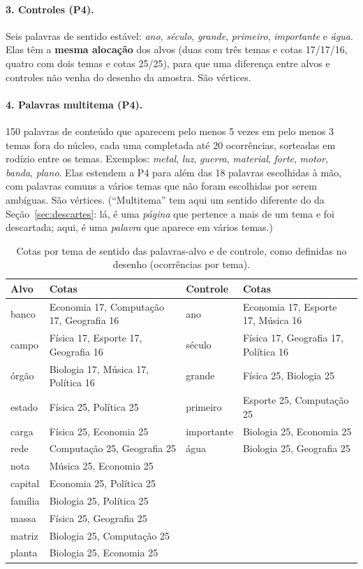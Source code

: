 \paragraph{3. Controles (P4).} Seis palavras de sentido estável: \emph{ano}, \emph{século},
\emph{grande}, \emph{primeiro}, \emph{importante} e \emph{água}. Elas têm a \textbf{mesma
alocação} dos alvos (duas com três temas e cotas 17/17/16, quatro com dois temas e cotas
25/25), para que uma diferença entre alvos e controles não venha do desenho da amostra. São
\nVerticesControle{} vértices.

\paragraph{4. Palavras multitema (P4).} 150 palavras de conteúdo que aparecem pelo menos 5
vezes em pelo menos 3 temas fora do núcleo, cada uma completada até 20 ocorrências, sorteadas
em rodízio entre os temas. Exemplos: \emph{metal}, \emph{luz}, \emph{guerra},
\emph{material}, \emph{forte}, \emph{motor}, \emph{banda}, \emph{plano}. Elas estendem a P4
para além das 18 palavras escolhidas à mão, com palavras comuns a vários temas que não foram
escolhidas por serem ambíguas. São \nVerticesMultitema{} vértices. (``Multitema'' tem aqui um
sentido diferente do da Seção~\ref{sec:descartes}: lá, é uma \emph{página} que pertence a
mais de um tema e foi descartada; aqui, é uma \emph{palavra} que aparece em vários temas.)

\begin{table}[htbp]
\centering
\caption{Cotas por tema de sentido das palavras-alvo e de controle, como definidas no desenho
(ocorrências por tema).}\label{tab:cotas}
\small
\begin{tabular}{@{}l l@{\hspace{2.5em}}l l@{}}
\toprule
\textbf{Alvo} & \textbf{Cotas} & \textbf{Controle} & \textbf{Cotas} \\
\midrule
banco & Economia 17, Computação 17, Geografia 16 & ano & Economia 17, Esporte 17, Música 16 \\
campo & Física 17, Esporte 17, Geografia 16 & século & Física 17, Geografia 17, Política 16 \\
órgão & Biologia 17, Música 17, Política 16 & grande & Física 25, Biologia 25 \\
estado & Física 25, Política 25 & primeiro & Esporte 25, Computação 25 \\
carga & Física 25, Economia 25 & importante & Biologia 25, Economia 25 \\
rede & Computação 25, Geografia 25 & água & Biologia 25, Geografia 25 \\
nota & Música 25, Economia 25 & & \\
capital & Economia 25, Política 25 & & \\
família & Biologia 25, Política 25 & & \\
massa & Física 25, Geografia 25 & & \\
matriz & Biologia 25, Computação 25 & & \\
planta & Biologia 25, Economia 25 & & \\
\bottomrule
\end{tabular}
\end{table}

